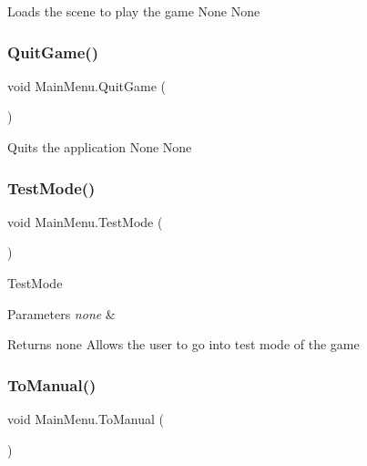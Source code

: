 Loads the scene to play the game  None  None \mbox{\label{class_main_menu_a485db7cf60c0b93ecc87b9273bcce78b}} 
\subsubsection{\texorpdfstring{Quit\+Game()}{QuitGame()}}
{\footnotesize\ttfamily void Main\+Menu.\+Quit\+Game (\begin{DoxyParamCaption}{ }\end{DoxyParamCaption})\hspace{0.3cm}{\ttfamily [inline]}}

Quits the application  None  None \mbox{\label{class_main_menu_a0d0cf4bf03eb9fc4bfcbaef384b6a42e}} 
\subsubsection{\texorpdfstring{Test\+Mode()}{TestMode()}}
{\footnotesize\ttfamily void Main\+Menu.\+Test\+Mode (\begin{DoxyParamCaption}{ }\end{DoxyParamCaption})\hspace{0.3cm}{\ttfamily [inline]}}

Test\+Mode 
\begin{DoxyParams}{Parameters}
{\em none} & \\
\hline
\end{DoxyParams}
\begin{DoxyReturn}{Returns}
none Allows the user to go into test mode of the game 
\end{DoxyReturn}
\mbox{\label{class_main_menu_a8286e477a22df9031ff4aea9431864ef}} 
\subsubsection{\texorpdfstring{To\+Manual()}{ToManual()}}
{\footnotesize\ttfamily void Main\+Menu.\+To\+Manual (\begin{DoxyParamCaption}{ }\end{DoxyParamCaption})\hspace{0.3cm}{\ttfamily [inline]}}


